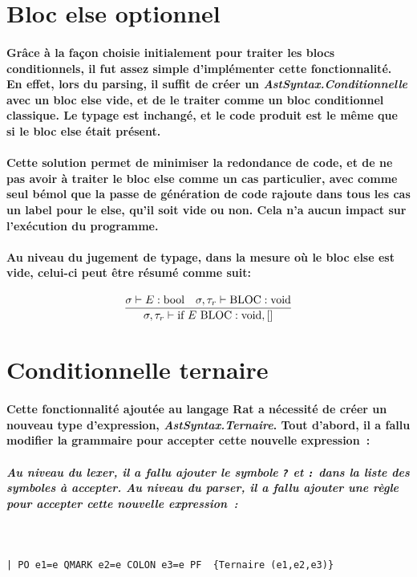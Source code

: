 \documentclass[french]{article}
\newcommand{\jugementElseOpt}{
        \dfrac{\sigma \vdash E : \text{bool} \hspace*{10pt} \sigma, \tau_r \vdash \text{BLOC} : \text{void}}
              {\sigma, \tau_r \vdash \text{if } E \text{ BLOC} : \text{void}, []}
        }
\begin{document}
\section{Bloc else optionnel}
\paragraph*{Grâce à la façon choisie initialement pour traiter les blocs conditionnels, il fut assez simple d'implémenter cette fonctionnalité.
En effet, lors du parsing, il suffit de créer un \textit{AstSyntax.Conditionnelle} avec un bloc else vide, et de le traiter comme un bloc conditionnel classique.
Le typage est inchangé, et le code produit est le même que si le bloc else était présent.}
\paragraph*{Cette solution permet de minimiser la redondance de code, et de ne pas avoir à traiter le bloc else comme un cas particulier, avec comme seul bémol
que la passe de génération de code rajoute dans tous les cas un label pour le else, qu'il soit vide ou non. Cela n'a aucun impact sur l'exécution du programme.}
\paragraph*{Au niveau du jugement de typage, dans la mesure où le bloc else est vide, celui-ci peut être résumé comme suit:}
\[\jugementElseOpt\]

\section{Conditionnelle ternaire}
\paragraph*{Cette fonctionnalité ajoutée au langage Rat a nécessité de créer un nouveau type d'expression, \textit{AstSyntax.Ternaire}.
Tout d'abord, il a fallu modifier la grammaire pour accepter cette nouvelle expression~:}
\subparagraph*{Au niveau du lexer, il a fallu ajouter le symbole \texttt{?} et \texttt{:} dans la liste des symboles à accepter. Au niveau du parser, il a fallu ajouter une règle pour accepter cette nouvelle expression~:}
\,%
\begin{lstlisting}
| PO e1=e QMARK e2=e COLON e3=e PF  {Ternaire (e1,e2,e3)}
\end{lstlisting}
\end{document}

